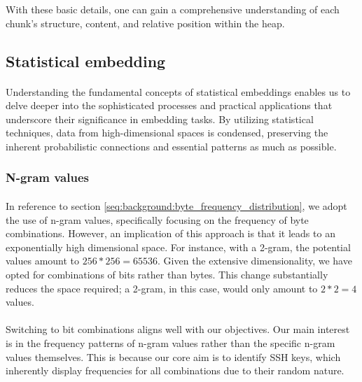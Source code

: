     With these basic details, one can gain a comprehensive understanding of each chunk's structure, content, and relative position within the heap.

\subsection{Statistical embedding}\label{sec:embedding:statistical}
    \paragraph{}Understanding the fundamental concepts of statistical embeddings enables us to delve deeper into the sophisticated processes and practical applications that underscore their significance in embedding tasks. By utilizing statistical techniques, data from high-dimensional spaces is condensed, preserving the inherent probabilistic connections and essential patterns as much as possible.

    \subsubsection{N-gram values}
        \paragraph{}In reference to section \ref{seq:background:byte_frequency_distribution}, we adopt the use of n-gram values, specifically focusing on the frequency of byte combinations. However, an implication of this approach is that it leads to an exponentially high dimensional space. For instance, with a 2-gram, the potential values amount to $256*256=65536$. Given the extensive dimensionality, we have opted for combinations of bits rather than bytes. This change substantially reduces the space required; a 2-gram, in this case, would only amount to $2*2=4$ values.

        \paragraph{}Switching to bit combinations aligns well with our objectives. Our main interest is in the frequency patterns of n-gram values rather than the specific n-gram values themselves. This is because our core aim is to identify SSH keys, which inherently display frequencies for all combinations due to their random nature.

